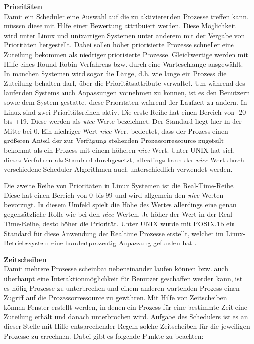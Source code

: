 \textbf{Prioritäten}\\
Damit ein Scheduler eine Auswahl auf die zu aktivierenden Prozesse treffen kann, müssen diese mit Hilfe einer Bewertung attribuiert werden. Diese Möglichkeit wird unter Linux und unixartigen Systemen unter anderem mit der Vergabe von Prioritäten hergestellt.
Dabei sollen höher priorisierte Prozesse schneller eine Zuteilung bekommen als niedriger priorisierte Prozesse. Gleichwertige werden mit Hilfe eines Round-Robin Verfahrens bzw. durch eine Warteschlange ausgewählt. In manchen Systemen wird sogar die Länge, d.h. wie lange ein Prozess die Zuteilung behalten darf, über die Prioritätsattribute verwaltet. Um während des laufenden Systems auch Anpassungen vornehmen zu kön\-nen, ist es den Benutzern sowie dem System gestattet diese Prioritäten während der Laufzeit zu ändern.
In Linux sind zwei Prioritäts\-reihen aktiv. Die erste Reihe hat einen Bereich von -20 bis +19. Diese werden als \textit{nice}-Werte bezeichnet. Der Standard liegt hier in der Mitte bei 0. Ein niedriger Wert \textit{nice}-Wert bedeutet, dass der Prozess einen größeren Anteil der zur Verfügung stehenden Prozessorressource zugeteilt bekommt als ein Prozess mit einem höheren \textit{nice}-Wert.
Unter UNIX hat sich dieses Verfahren als Standard durchgesetzt, allerdings kann der \textit{nice}-Wert durch verschiedene Scheduler-Algorithmen auch unterschiedlich verwendet werden.

Die zweite Reihe von Prioritäten in Linux Systemen ist die Real-Time-Reihe. Diese hat einen Bereich von 0 bis 99 und wird allgemein den \textit{nice}-Werten bevorzugt. In diesem Umfeld spielt die Höhe des Wertes allerdings eine genau gegensätzliche Rolle wie bei den \textit{nice}-Werten. Je höher der Wert in der Real-Time-Reihe, desto höher die Priorität. Unter UNIX wurde mit POSIX.1b ein Standard für diese Anwendung der Realtime Prozesse erstellt, welcher im Linux-Betriebssystem eine hundertprozentig Anpassung gefunden hat \cite{rlove}.

\textbf{Zeitscheiben}\\
Damit mehrere Prozesse scheinbar nebeneinander laufen können bzw. auch überhaupt eine Interaktionmöglichkeit für Benutzer geschaffen werden kann, ist es nötig Prozesse zu unterbrechen und einem anderen wartenden Prozess einen Zugriff auf die Prozessor\-ressource zu gewähren. Mit Hilfe von Zeitscheiben können Fenster erstellt werden, in denen ein Prozess für eine bestimmte Zeit eine Zuteilung erhält und danach unterbrochen wird.
Aufgabe des Schedulers ist es an dieser Stelle mit Hilfe entsprechender Regeln solche Zeitscheiben für die jeweiligen Prozesse zu errechnen. Dabei gibt es folgende Punkte zu beachten:

